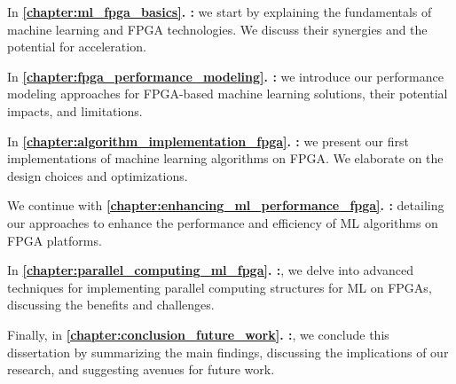 In \textbf{\autoref{chapter:ml_fpga_basics}. :} we start by explaining the fundamentals of machine learning and FPGA technologies. We discuss their synergies and the potential for acceleration.

In \textbf{\autoref{chapter:fpga_performance_modeling}. :} we introduce our performance modeling approaches for FPGA-based machine learning solutions, their potential impacts, and limitations. 

In \textbf{\autoref{chapter:algorithm_implementation_fpga}. :} we present our first implementations of machine learning algorithms on FPGA. We elaborate on the design choices and optimizations.

We continue with \textbf{\autoref{chapter:enhancing_ml_performance_fpga}. :} detailing our approaches to enhance the performance and efficiency of ML algorithms on FPGA platforms.

In \textbf{\autoref{chapter:parallel_computing_ml_fpga}. :}, we delve into advanced techniques for implementing parallel computing structures for ML on FPGAs, discussing the benefits and challenges.

Finally, in \textbf{\autoref{chapter:conclusion_future_work}. :}, we conclude this dissertation by summarizing the main findings, discussing the implications of our research, and suggesting avenues for future work.

